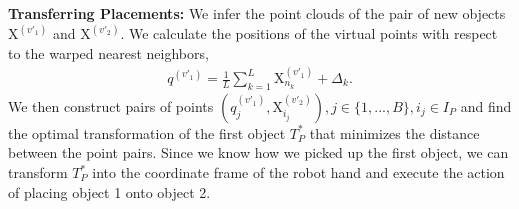 \documentclass{article}
\newcommand{\pcx}[1]{\mathrm{X}^{(#1)}}
\begin{document}
\textbf{Transferring Placements:} We infer the point clouds of the pair of new objects $\pcx{v'_1}$ and $\pcx{v'_2}$. We calculate the positions of the virtual points with respect to the warped nearest neighbors,
\begin{align}
    q^{(v'_1)} = \frac{1}{L} \sum_{k=1}^L \pcx{v'_1}_{n_k} + \Delta_k.
\end{align}
We then construct pairs of points $(q^{(v'_1)}_j, \pcx{v'_2}_{i_j}), j \in \{1, ..., B\}, i_j \in I_P$ and find the optimal transformation of the first object $T^*_P$ that minimizes the distance between the point pairs. Since we know how we picked up the first object, we can transform $T^*_P$ into the coordinate frame of the robot hand and execute the action of placing object 1 onto object 2.





\end{document}
